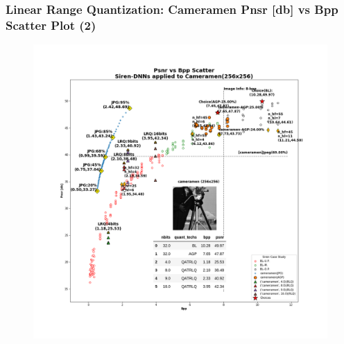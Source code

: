 \begin{frame}
    \frametitle{Linear Range Quantization: Cameramen Pnsr [db] vs Bpp Scatter Plot (2)}

    \begin{figure}
    \includegraphics[scale=0.22]{slides/experiments/quant_dataset/images/cameramen_jpeg_quanted_siren_2.png}
    \end{figure}

\end{frame}



